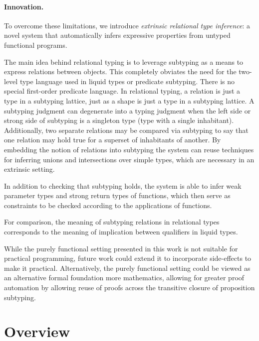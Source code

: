 \documentclass[acmsmall]{acmart}
\begin{document}
\paragraph{Innovation.} 
To overcome these limitations, we introduce \textit{extrinsic relational type inference}: 
a novel system
that automatically infers expressive properties from untyped functional programs. 

The main idea behind relational typing is to leverage subtyping as a means to express relations
between objects. This completely obviates the need for the two-level type language
used in liquid types or predicate subtyping. There is no special first-order predicate language. 
In relational typing, a relation is just a type in a subtyping lattice, just as a shape is just  
a type in a subtyping lattice. A subtyping judgment can degenerate into a typing judgment
when the left side or strong side of subtyping is a singleton type (type with a single inhabitant).
Additionally, two separate relations may be compared via subtyping to say that one relation may hold true for a superset of inhabitants 
of another.
By embedding the notion of relations into subtyping the system can reuse techniques for inferring unions and
intersections over simple types, which are necessary in an extrinsic setting. 

In addition to checking that subtyping holds, the system is able to infer weak 
parameter types and strong return types of functions, which then serve as constraints
to be checked according to the applications of functions.

For comparison, the meaning of subtyping relations in relational types corresponds 
to the meaning of implication between qualifiers in liquid types.

While the purely functional setting presented in this work is not suitable for practical programming,
future work could extend it to incorporate side-effects to make it practical.
Alternatively, the purely functional setting could be viewed as an alternative formal foundation more
mathematics, allowing for greater proof automation by allowing reuse of proofs across the transitive closure of 
proposition subtyping.



\section{Overview}
\end{document}
